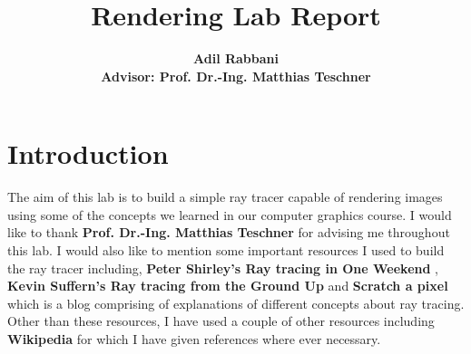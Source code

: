\documentclass[11pt,a4paper]{article}
\begin{document}
	
	\title{\textbf{Rendering Lab Report}}
	\author{\textbf{Adil Rabbani} \\ \textbf{Advisor: Prof. 
			Dr.-Ing. Matthias Teschner}}
	\maketitle
	
	\section{Introduction}
	The aim of this lab is to build a simple ray tracer capable of rendering images using some of the concepts we learned in our computer graphics course. I would like to thank \textbf{Prof. Dr.-Ing. Matthias Teschner} for advising me throughout this lab. I would also like to mention some important resources I used to build the ray tracer including, \textbf{Peter Shirley's Ray tracing in One Weekend} \cite{Shirley2020RTW1}, \textbf{Kevin Suffern's Ray tracing from the Ground Up} \cite{suffern2016ray} and \textbf{Scratch a pixel} \cite{scratchapixel} which is a blog comprising of explanations of different concepts about ray tracing. Other than these resources, I have used a couple of other resources including \textbf{Wikipedia} for which I have given references where ever necessary.
	
\end{document}
